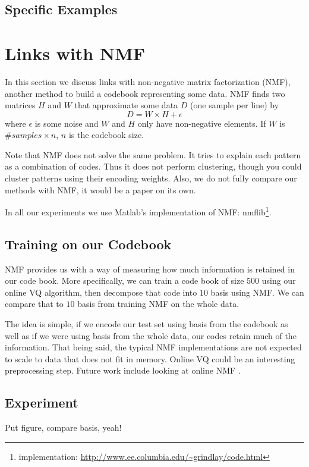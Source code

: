 \documentclass{article}
\begin{document}
\subsection{Specific Examples}


\section{Links with NMF}\label{sec:nmf}
In this section we discuss links with non-negative matrix factorization
\cite{Lee2000} (NMF), another method to build a codebook representing some data.
NMF finds two matrices $H$ and $W$ that approximate some data $D$ (one
sample per line) by
\[
D = W \times H + \epsilon
\]
where $\epsilon$ is some noise and $W$ and $H$ only have non-negative 
elements. If $W$ is $\#samples \times n$, $n$ is the codebook size.

Note that NMF does not solve the same problem. It tries to explain each pattern
as a combination of codes. Thus it does not perform clustering, though you
could cluster patterns using their encoding weights. Also, we do not fully
compare our methods with NMF, it would be a paper on its own.

In all our experiments we use Matlab's implementation of NMF:
nmflib\footnote{implementation: \url{http://www.ee.columbia.edu/~grindlay/code.html}}.

\subsection{Training on our Codebook}
NMF provides us with a way of measuring how much information is retained
in our code book. More specifically, we can train a code book of size $500$
using our online VQ algorithm, then decompose that code into $10$ basis
using NMF. We can compare that to $10$ basis from training NMF on the
whole data.

The idea is simple, if we encode our test set using basis from the
codebook as well as if we were using basis from the whole data, our codes
retain much of the information. That being said, the typical NMF implementations
are not expected to scale to data that does not fit in memory. Online VQ
could be an interesting preprocessing step. Future work include looking
at online NMF \cite{Thurau2009}.

\subsection{Experiment}
Put figure, compare basis, yeah!
\end{document}
